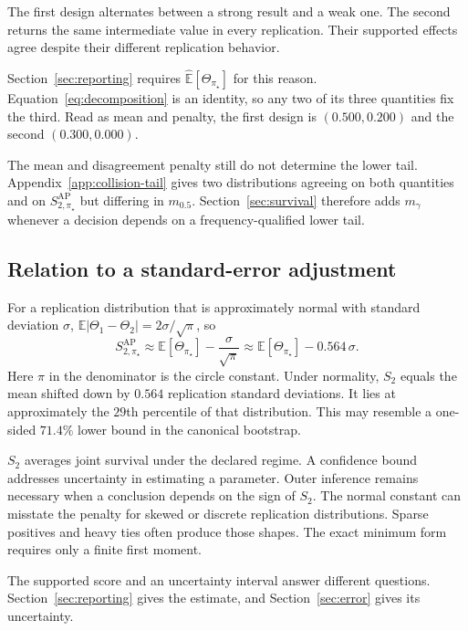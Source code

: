 \documentclass[11pt]{article}
\newcommand{\E}{\mathbb{E}}
\newcommand{\SAP}{S_{2,\pi_\star}^{\mathrm{AP}}}
\theoremstyle{remark}
\begin{document}
The first design alternates between a strong result and a weak one. The second returns the same intermediate value in every replication. Their supported effects agree despite their different replication behavior.

Section~\ref{sec:reporting} requires $\widehat{\E}[\Theta_{\pi_\star}]$ for this reason. Equation~\eqref{eq:decomposition} is an identity, so any two of its three quantities fix the third. Read as mean and penalty, the first design is $(0.500,0.200)$ and the second $(0.300,0.000)$.

The mean and disagreement penalty still do not determine the lower tail. Appendix~\ref{app:collision-tail} gives two distributions agreeing on both quantities and on $\SAP$ but differing in $m_{0.5}$. Section~\ref{sec:survival} therefore adds $m_\gamma$ whenever a decision depends on a frequency-qualified lower tail.

\subsection{Relation to a standard-error adjustment}

For a replication distribution that is approximately normal with standard deviation $\sigma$, $\E|\Theta_1-\Theta_2|=2\sigma/\sqrt{\pi}$, so
\begin{equation}
\SAP
\approx
\E[\Theta_{\pi_\star}]-\frac{\sigma}{\sqrt{\pi}}
\approx
\E[\Theta_{\pi_\star}]-0.564\,\sigma .
\label{eq:se-approximation}
\end{equation}
Here $\pi$ in the denominator is the circle constant. Under normality, $S_2$ equals the mean shifted down by $0.564$ replication standard deviations. It lies at approximately the $29$th percentile of that distribution. This may resemble a one-sided $71.4\%$ lower bound in the canonical bootstrap.

$S_2$ averages joint survival under the declared regime. A confidence bound addresses uncertainty in estimating a parameter. Outer inference remains necessary when a conclusion depends on the sign of $S_2$. The normal constant can misstate the penalty for skewed or discrete replication distributions. Sparse positives and heavy ties often produce those shapes. The exact minimum form requires only a finite first moment.

The supported score and an uncertainty interval answer different questions. Section~\ref{sec:reporting} gives the estimate, and Section~\ref{sec:error} gives its uncertainty.
\end{document}

